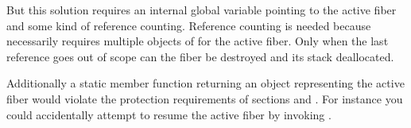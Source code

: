 But this solution requires an internal global variable pointing to the active
fiber and some kind of reference counting. Reference counting is needed because
 necessarily requires multiple objects of \fiber for the
active fiber. Only when the last reference goes out of scope can the fiber be
destroyed and its stack deallocated.

Additionally a static member function returning an object representing the active fiber
would violate the protection requirements of sections  and
. For instance you could accidentally attempt to resume
the active fiber by invoking \resume.


